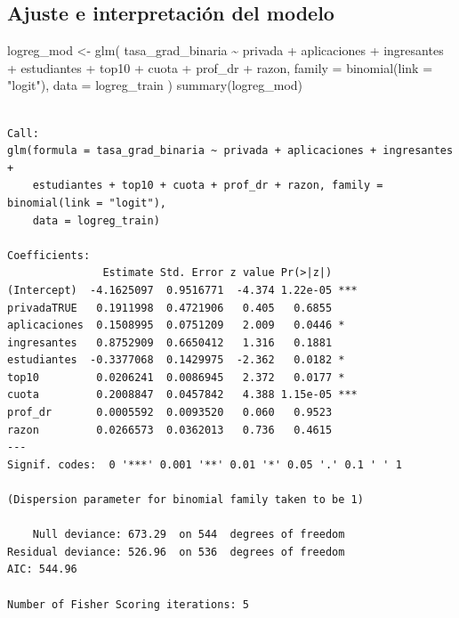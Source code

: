 \documentclass[
  letterpaper,
  DIV=11,
  numbers=noendperiod]{scrartcl}
\newenvironment{Shaded}{\begin{snugshade}}{\end{snugshade}}
\newcommand{\AttributeTok}[1]{\textcolor[rgb]{0.40,0.45,0.13}{#1}}
\newcommand{\FunctionTok}[1]{\textcolor[rgb]{0.28,0.35,0.67}{#1}}
\newcommand{\NormalTok}[1]{\textcolor[rgb]{0.00,0.23,0.31}{#1}}
\newcommand{\OtherTok}[1]{\textcolor[rgb]{0.00,0.23,0.31}{#1}}
\newcommand{\SpecialCharTok}[1]{\textcolor[rgb]{0.37,0.37,0.37}{#1}}
\newcommand{\StringTok}[1]{\textcolor[rgb]{0.13,0.47,0.30}{#1}}
\begin{document}
\hypertarget{ajuste-e-interpretaciuxf3n-del-modelo}{%
\subsection{Ajuste e interpretación del
modelo}\label{ajuste-e-interpretaciuxf3n-del-modelo}}

\begin{Shaded}
\begin{Highlighting}[]
\NormalTok{logreg\_mod }\OtherTok{\textless{}{-}} \FunctionTok{glm}\NormalTok{(}
\NormalTok{  tasa\_grad\_binaria }\SpecialCharTok{\textasciitilde{}}\NormalTok{ privada }\SpecialCharTok{+}\NormalTok{ aplicaciones }\SpecialCharTok{+}\NormalTok{ ingresantes }\SpecialCharTok{+}\NormalTok{ estudiantes }\SpecialCharTok{+}\NormalTok{ top10 }\SpecialCharTok{+}\NormalTok{ cuota }\SpecialCharTok{+}\NormalTok{ prof\_dr }\SpecialCharTok{+}\NormalTok{ razon, }
  \AttributeTok{family =} \FunctionTok{binomial}\NormalTok{(}\AttributeTok{link =} \StringTok{"logit"}\NormalTok{), }\AttributeTok{data =}\NormalTok{ logreg\_train}
\NormalTok{)}
\FunctionTok{summary}\NormalTok{(logreg\_mod)}
\end{Highlighting}
\end{Shaded}

\begin{verbatim}

Call:
glm(formula = tasa_grad_binaria ~ privada + aplicaciones + ingresantes + 
    estudiantes + top10 + cuota + prof_dr + razon, family = binomial(link = "logit"), 
    data = logreg_train)

Coefficients:
               Estimate Std. Error z value Pr(>|z|)    
(Intercept)  -4.1625097  0.9516771  -4.374 1.22e-05 ***
privadaTRUE   0.1911998  0.4721906   0.405   0.6855    
aplicaciones  0.1508995  0.0751209   2.009   0.0446 *  
ingresantes   0.8752909  0.6650412   1.316   0.1881    
estudiantes  -0.3377068  0.1429975  -2.362   0.0182 *  
top10         0.0206241  0.0086945   2.372   0.0177 *  
cuota         0.2008847  0.0457842   4.388 1.15e-05 ***
prof_dr       0.0005592  0.0093520   0.060   0.9523    
razon         0.0266573  0.0362013   0.736   0.4615    
---
Signif. codes:  0 '***' 0.001 '**' 0.01 '*' 0.05 '.' 0.1 ' ' 1

(Dispersion parameter for binomial family taken to be 1)

    Null deviance: 673.29  on 544  degrees of freedom
Residual deviance: 526.96  on 536  degrees of freedom
AIC: 544.96

Number of Fisher Scoring iterations: 5
\end{verbatim}
\end{document}
